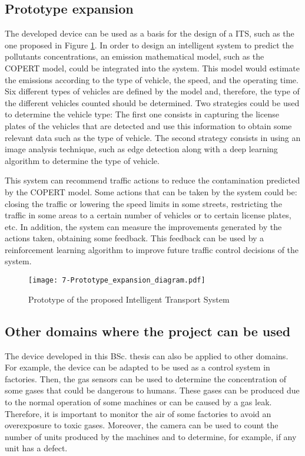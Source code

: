 \subsection{Prototype expansion}
The developed device can be used as a basis for the design of a \ac{ITS}, such as the one proposed in Figure \ref{fig:7-Prototype_expansion_diagram}. In order to design an intelligent system to predict the pollutants concentrations, an emission mathematical model, such as the COPERT \cite{NS16} model, could be integrated into the system. This model would estimate the emissions according to the type of vehicle, the speed, and the operating time. Six different types of vehicles are defined by the model and, therefore, the type of the different vehicles counted should be determined. Two strategies could be used to determine the vehicle type: The first one consists in capturing the license plates of the vehicles that are detected and use this information to obtain some relevant data such as the type of vehicle. The second strategy consists in using an image analysis technique, such as edge detection along with a deep learning algorithm to determine the type of vehicle.

This system can recommend traffic actions to reduce the contamination predicted by the COPERT model. Some actions that can be taken by the system could be: closing the traffic or lowering the speed limits in some streets, restricting the traffic in some areas to a certain number of vehicles or to certain license plates, etc. In addition, the system can measure the improvements generated by the actions taken, obtaining some feedback. This feedback can be used by a reinforcement learning algorithm to improve future traffic control decisions of the system.

\begin{figure}[!h]
	\begin{center}
		\texttt{[image: 7-Prototype\_expansion\_diagram.pdf]}
		\caption{Prototype of the proposed Intelligent Transport System}
		\label{fig:7-Prototype_expansion_diagram}
	\end{center}
\end{figure}


\subsection{Other domains where the project can be used}
The device developed in this \ac{BSc.} thesis can also be applied to other domains. For example, the device can be adapted to be used as a control system in factories. Then, the gas sensors can be used to determine the concentration of some gases that could be dangerous to humans. These gases can be produced due to the normal operation of some machines or can be caused by a gas leak. Therefore, it is important to monitor the air of some factories to avoid an overexposure to toxic gases. Moreover, the camera can be used to count the number of units produced by the machines and to determine, for example, if any unit has a defect.


